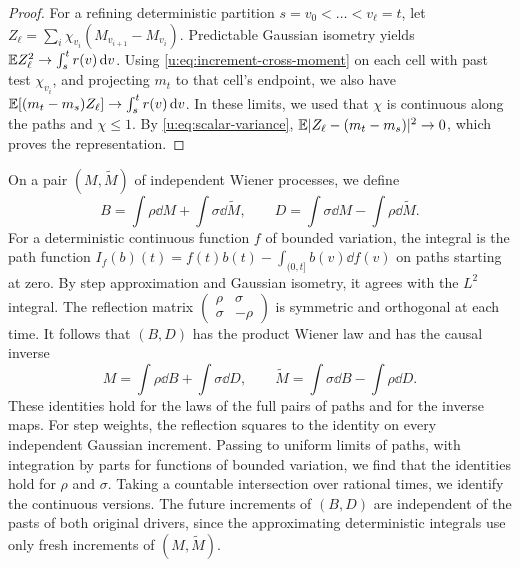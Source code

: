 \begin{proof}
For a refining deterministic partition $s=v_0<\dots<v_\ell=t$, let
$Z_\ell=\sum_i\chi_{v_i}(M_{v_{i+1}}-M_{v_i})$.
Predictable Gaussian isometry yields
$\mathbb E Z_\ell^2\to\int_s^t r(v)\,\mathrm d v$.
Using \eqref{u:eq:increment-cross-moment} on each cell with past
test $\chi_{v_i}$, and projecting $m_t$ to that cell's endpoint,
we also have
$\mathbb E[(m_t-m_s)Z_\ell]\to\int_s^t r(v)\,\mathrm d v$.
In these limits, we used that $\chi$ is continuous along the
paths and $\chi\le1$. By \eqref{u:eq:scalar-variance},
$\mathbb E|Z_\ell-(m_t-m_s)|^2\to0$, which proves the representation.
\end{proof}

On a pair $(M,\widetilde M)$ of independent Wiener processes, we define
\begin{equation}\label{u:eq:reflection}
 B=\int\rho\dd M+\int\sigma\dd\widetilde M,\qquad
 D=\int\sigma\dd M-\int\rho\dd\widetilde M.
\end{equation}
For a deterministic continuous function $f$ of bounded variation,
the integral is the path function
$I_f(b)(t)=f(t)b(t)-\int_{(0,t]}b(v)\dd f(v)$ on paths starting at
zero. By step approximation and Gaussian isometry, it agrees with the
$L^2$ integral. The reflection matrix
$\left(\begin{smallmatrix}\rho&\sigma\\\sigma&-\rho\end{smallmatrix}\right)$
is symmetric and orthogonal at each time. It follows that $(B,D)$
has the product Wiener law and has the causal inverse
\[
 M=\int\rho\dd B+\int\sigma\dd D,\qquad
 \widetilde M=\int\sigma\dd B-\int\rho\dd D.
\]
These identities hold for the laws of the full pairs of paths and for
the inverse maps.
For step weights, the reflection squares to the identity on every
independent Gaussian increment. Passing to uniform limits of paths,
with integration by parts for functions of bounded variation, we
find that the identities hold for $\rho$ and $\sigma$. Taking a countable
intersection over rational times, we identify the continuous versions.
The future increments of $(B,D)$ are independent of the pasts of both
original drivers, since the approximating deterministic integrals use
only fresh increments of $(M,\widetilde M)$.

